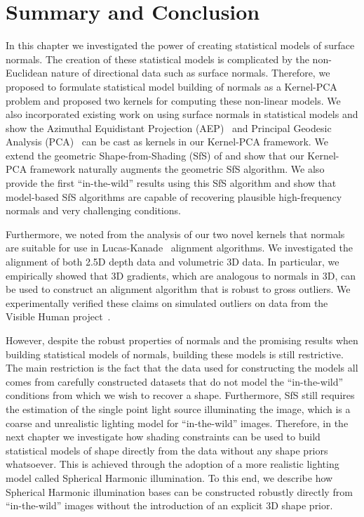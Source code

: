 \section{Summary and Conclusion}\label{sec:singl_img_summary}
In this chapter we investigated the power of creating statistical models
of surface normals. The creation of these statistical models is complicated
by the non-Euclidean nature of directional data such as surface normals.
Therefore, we proposed to formulate statistical model building of normals
as a Kernel-PCA problem and proposed two kernels for computing these non-linear
models. We also incorporated existing work on using surface normals in
statistical models and show the
Azimuthal Equidistant Projection (AEP)~\cite{smith2006recovering} and
Principal Geodesic Analysis (PCA)~\cite{smith2008facial} can be cast as
kernels in our Kernel-PCA framework. We extend the geometric
Shape-from-Shading (SfS) of \citet{smith2006recovering} and show that our
Kernel-PCA framework naturally augments the geometric SfS algorithm. We also
provide the first ``in-the-wild'' results using this SfS algorithm and show
that model-based SfS algorithms are capable of recovering plausible high-frequency
normals and very challenging conditions.

Furthermore, we noted from the analysis of our two novel kernels that normals
are suitable for use in Lucas-Kanade~\cite{lucas1981iterative} alignment
algorithms. We investigated the alignment of both 2.5D depth data and volumetric
3D data. In particular, we empirically showed that 3D gradients, which are
analogous to normals in 3D, can be used to construct an alignment algorithm
that is robust to gross outliers. We experimentally verified these claims
on simulated outliers on data from the
Visible Human project~\cite{spitzer1996visiblehuman}.

However, despite the robust properties of normals and the promising results
when building statistical models of normals, building these models is still
restrictive. The main restriction is the fact that the data used
for constructing the models all comes from carefully constructed datasets
that do not model the ``in-the-wild'' conditions from which we wish to recover
a shape. Furthermore, SfS still requires the estimation of the single point light
source illuminating the image, which is a coarse and unrealistic lighting
model for ``in-the-wild'' images. Therefore, in the next chapter we investigate
how shading constraints can be used to build statistical models of shape
directly from the data without any shape priors whatsoever. This is achieved
through the adoption of a more realistic lighting model called Spherical
Harmonic illumination. To this end, we describe how Spherical Harmonic illumination
bases can be constructed robustly directly from ``in-the-wild'' images
without the introduction of an explicit 3D shape prior.
